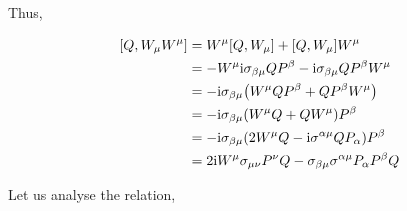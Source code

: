 Thus,

\begin{align}
    \comm{Q}{W_\mu W^\mu}&=W^\mu\comm{Q}{W_\mu}+\comm{Q}{W_\mu}W^\mu\nonumber\\
    &=-W^\mu\im\sigma_{\beta\mu}QP^\beta-\im\sigma_{\beta\mu}QP^\beta W^\mu\nonumber\\
    &=-\im\sigma_{\beta\mu}\qty(W^\mu QP^\beta+QP^\beta W^\mu)\nonumber\\
    &=-\im\sigma_{\beta\mu}\qty(W^\mu Q+QW^\mu)P^\beta\nonumber\\
    &=-\im\sigma_{\beta\mu}\qty(2W^\mu Q-\im\sigma^{\alpha\mu} QP_\alpha)P^\beta\nonumber\\
    &=2\im W^\mu\sigma_{\mu\nu}P^\nu Q-\sigma_{\beta\mu}\sigma^{\alpha\mu}P_\alpha P^\beta Q\nonumber
\end{align}

Let us analyse the relation,

